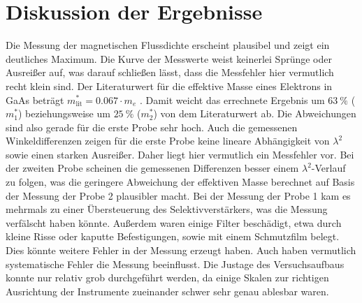 \section{Diskussion der Ergebnisse}
\label{sec:Diskussion}
Die Messung der magnetischen Flussdichte erscheint plausibel und zeigt ein
deutliches Maximum. Die Kurve der Messwerte weist keinerlei Sprünge oder
Ausreißer auf, was darauf schließen lässt, dass die Messfehler hier vermutlich
recht klein sind.
Der Literaturwert für die effektive Masse eines Elektrons in GaAs beträgt
 $ m_{\text{lit}}^{*} = 0.067 \cdot m_{e}$ \cite{effektiveMasse}.
Damit weicht das errechnete Ergebnis um $\SI{63}{\percent}$ ($m_{1}^{*}$)
beziehungsweise um $\SI{25}{\percent}$ ($m_{2}^{*}$) von dem  Literaturwert
ab. Die Abweichungen sind also gerade für die erste Probe sehr hoch. Auch
die gemessenen Winkeldifferenzen zeigen für die erste Probe keine lineare
Abhängigkeit von $\lambda^{2}$ sowie einen starken Ausreißer. Daher liegt hier
vermutlich ein Messfehler vor. Bei der zweiten Probe scheinen die
gemessenen Differenzen besser einem $\lambda^{2}$-Verlauf zu folgen, was
die geringere Abweichung der effektiven Masse berechnet auf Basis der
Messung der Probe 2 plausibler macht. Bei der Messung der Probe 1
kam es mehrmals zu einer Übersteuerung des Selektivverstärkers, was
die Messung verfälscht haben könnte. Außerdem waren einige Filter beschädigt,
etwa durch kleine Risse oder kaputte Befestigungen, sowie mit einem Schmutzfilm
belegt. Dies könnte weitere Fehler in der Messung erzeugt haben.
Auch haben vermutlich systematische Fehler die Messung beeinflusst. Die
Justage des Versuchsaufbaus konnte nur relativ grob durchgeführt werden,
da einige Skalen zur richtigen Ausrichtung der Instrumente zueinander
schwer sehr genau ablesbar waren.
